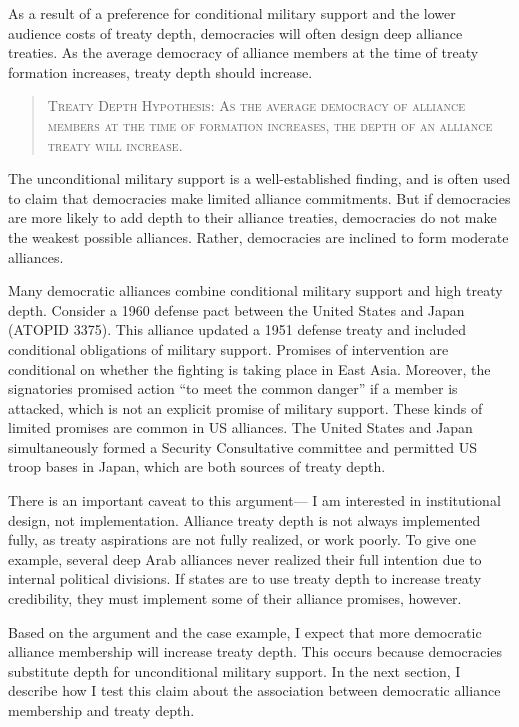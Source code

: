 \documentclass[12pt]{article}
\begin{document}
As a result of a preference for conditional military support and the lower audience costs of treaty depth, democracies will often design deep alliance treaties. 
As the average democracy of alliance members at the time of treaty formation increases, treaty depth should increase. 


\begin{quote}
\textsc{Treaty Depth Hypothesis: As the average democracy of alliance members at the time of formation increases, the depth of an alliance treaty will increase.}
\end{quote} 


The unconditional military support is a well-established finding, and is often used to claim that democracies make limited alliance commitments. 
But if democracies are more likely to add depth to their alliance treaties, democracies do not make the weakest possible alliances. 
Rather, democracies are inclined to form moderate alliances. 


Many democratic alliances combine conditional military support and high treaty depth. 
Consider a 1960 defense pact between the United States and Japan (ATOPID 3375).
This alliance updated a 1951 defense treaty and included conditional obligations of military support. 
Promises of intervention are conditional on whether the fighting is taking place in East Asia. 
Moreover, the signatories promised action ``to meet the common danger'' if a member is attacked, which is not an explicit promise of military support. 
These kinds of limited promises are common in US alliances. 
The United States and Japan simultaneously formed a Security Consultative committee and permitted US troop bases in Japan, which are both sources of treaty depth. 




There is an important caveat to this argument--- I am interested in institutional design, not implementation.
Alliance treaty depth is not always implemented fully, as treaty aspirations are not fully realized, or work poorly. 
To give one example, several deep Arab alliances never realized their full intention due to internal political divisions.  
If states are to use treaty depth to increase treaty credibility, they must implement some of their alliance promises, however. 


Based on the argument and the case example, I expect that more democratic alliance membership will increase treaty depth. 
This occurs because democracies substitute depth for unconditional military support. 
In the next section, I describe how I test this claim about the association between democratic alliance membership and treaty depth. 
\end{document}
